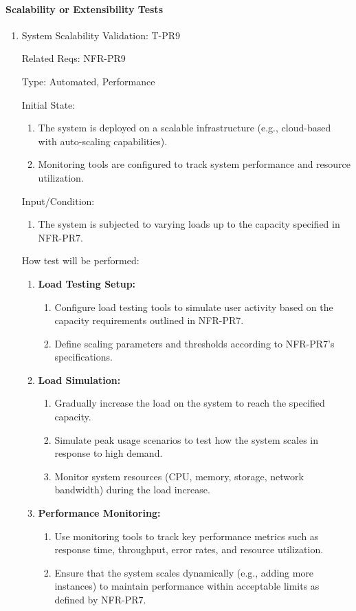 \documentclass[12pt, titlepage]{article}
\begin{document}
\paragraph{Scalability or Extensibility Tests}
\begin{enumerate}

\item{System Scalability Validation: T-PR9\\}

Related Reqs: NFR-PR9

Type: Automated, Performance

Initial State:
\begin{enumerate}
    \item The system is deployed on a scalable infrastructure (e.g., cloud-based with auto-scaling capabilities).
    \item Monitoring tools are configured to track system performance and resource utilization.
\end{enumerate}
Input/Condition:
\begin{enumerate}
    \item The system is subjected to varying loads up to the capacity specified in NFR-PR7.
\end{enumerate}
How test will be performed:
\begin{enumerate}
    \item \textbf{Load Testing Setup:}
    \begin{enumerate}
        \item Configure load testing tools to simulate user activity based on the capacity requirements outlined in NFR-PR7.
        \item Define scaling parameters and thresholds according to NFR-PR7's specifications.
    \end{enumerate}
    
    \item \textbf{Load Simulation:}
    \begin{enumerate}
        \item Gradually increase the load on the system to reach the specified capacity.
        \item Simulate peak usage scenarios to test how the system scales in response to high demand.
        \item Monitor system resources (CPU, memory, storage, network bandwidth) during the load increase.
    \end{enumerate}
    
    \item \textbf{Performance Monitoring:}
    \begin{enumerate}
        \item Use monitoring tools to track key performance metrics such as response time, throughput, error rates, and resource utilization.
        \item Ensure that the system scales dynamically (e.g., adding more instances) to maintain performance within acceptable limits as defined by NFR-PR7.
    \end{enumerate}
    

\end{enumerate}
\end{enumerate}
\end{document}
